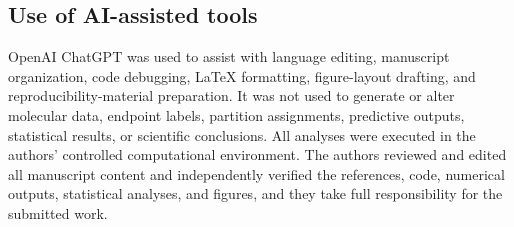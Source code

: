 \subsection{Use of AI-assisted tools}

OpenAI ChatGPT was used to assist with language editing, manuscript organization, code debugging, LaTeX formatting, figure-layout drafting, and reproducibility-material preparation. It was not used to generate or alter molecular data, endpoint labels, partition assignments, predictive outputs, statistical results, or scientific conclusions. All analyses were executed in the authors' controlled computational environment. The authors reviewed and edited all manuscript content and independently verified the references, code, numerical outputs, statistical analyses, and figures, and they take full responsibility for the submitted work.
